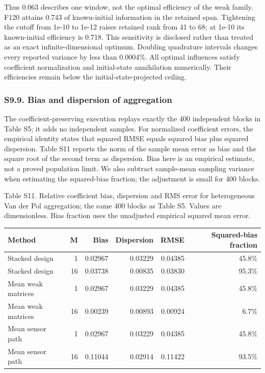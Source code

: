 \documentclass[
  american,
  11pt,
]{article}
\begin{document}
Thus 0.063 describes one window, not the optimal efficiency of the weak
family. F120 attains 0.743 of known-initial information in the retained
span. Tightening the cutoff from 1e-10 to 1e-12 raises retained rank
from 41 to 68; at 1e-10 its known-initial efficiency is 0.718. This
sensitivity is disclosed rather than treated as an exact
infinite-dimensional optimum. Doubling quadrature intervals changes
every reported variance by less than 0.0004\%. All optimal influences
satisfy coefficient normalization and initial-state annihilation
numerically. Their efficiencies remain below the initial-state-projected
ceiling.

\subsubsection{S9.9. Bias and dispersion of
aggregation}\label{s9.9.-bias-and-dispersion-of-aggregation}

The coefficient-preserving execution replays exactly the 400 independent
blocks in Table S5; it adds no independent samples. For normalized
coefficient errors, the empirical identity states that squared RMSE
equals squared bias plus squared dispersion. Table S11 reports the norm
of the sample mean error as bias and the square root of the second term
as dispersion. Bias here is an empirical estimate, not a proved
population limit. We also subtract sample-mean sampling variance when
estimating the squared-bias fraction; the adjustment is small for 400
blocks.

\begin{center}
\begin{minipage}{\linewidth}
Table S11. Relative coefficient bias, dispersion and RMS error for
heterogeneous Van der Pol aggregation; the same 400 blocks as Table S5.
Values are dimensionless. Bias fraction uses the unadjusted empirical
squared mean error.

\small\setlength{\tabcolsep}{3pt}
\begin{tabular}{@{}lrrrrr@{}}
\toprule\noalign{}
Method & M & Bias & Dispersion & RMSE & Squared-bias fraction \\
\midrule\noalign{}
Stacked design & 1 & 0.02967 & 0.03229 & 0.04385 & 45.8\% \\
Stacked design & 16 & 0.03738 & 0.00835 & 0.03830 & 95.3\% \\
Mean weak matrices & 1 & 0.02967 & 0.03229 & 0.04385 & 45.8\% \\
Mean weak matrices & 16 & 0.00239 & 0.00893 & 0.00924 & 6.7\% \\
Mean sensor path & 1 & 0.02967 & 0.03229 & 0.04385 & 45.8\% \\
Mean sensor path & 16 & 0.11044 & 0.02914 & 0.11422 & 93.5\% \\
\bottomrule
\end{tabular}
\end{minipage}
\end{center}
\end{document}
